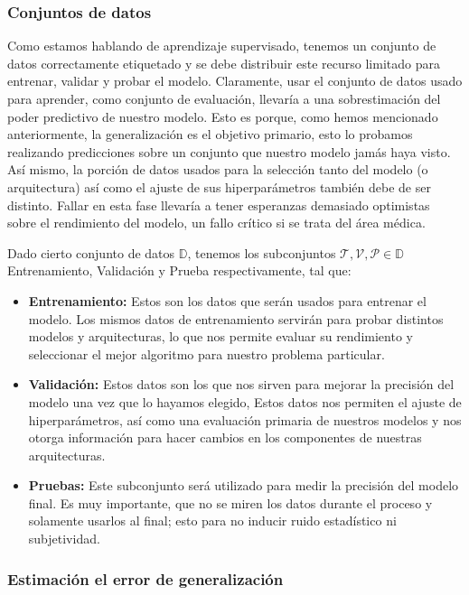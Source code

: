 \subsubsection{Conjuntos de datos}

Como estamos hablando de aprendizaje supervisado, tenemos un conjunto de datos
correctamente etiquetado y se debe distribuir este recurso limitado para
entrenar, validar y probar el modelo. Claramente, usar el conjunto de datos
usado para aprender, como conjunto de evaluación, llevaría a una sobrestimación
del poder predictivo de nuestro modelo. Esto es porque, como hemos mencionado
anteriormente, la generalización es el objetivo primario, esto lo probamos
realizando predicciones sobre un conjunto que nuestro modelo jamás haya visto.
Así mismo, la porción de datos usados para la selección tanto del modelo (o
arquitectura) así como el ajuste de sus hiperparámetros también debe de ser
distinto. Fallar en esta fase llevaría a tener esperanzas demasiado optimistas
sobre el rendimiento del modelo, un fallo crítico si se trata del área
médica.~\cite{Learningb}

Dado cierto conjunto de datos \(\mathbb{D}\), tenemos los subconjuntos
\(\mathcal{T}, \mathcal{V}, \mathcal{P} \in \mathbb{D}\) Entrenamiento,
Validación y Prueba respectivamente, tal que:

\begin{itemize}
    \item{\textbf{Entrenamiento:}} Estos son los datos que serán usados para
    entrenar el modelo. Los mismos datos de entrenamiento servirán para probar
    distintos modelos y arquitecturas, lo que nos permite evaluar su rendimiento
    y seleccionar el mejor algoritmo para nuestro problema particular. 
    \item{\textbf{Validación:}} Estos datos son los que nos sirven para mejorar
    la precisión del modelo una vez que lo hayamos elegido, Estos datos nos
    permiten el ajuste de hiperparámetros, así como una evaluación primaria de
    nuestros modelos y nos otorga información para hacer cambios en los
    componentes de nuestras arquitecturas.
    \item{\textbf{Pruebas:}} Este subconjunto será utilizado para medir la
    precisión del modelo final. Es muy importante, que no se miren los datos
    durante el proceso y solamente usarlos al final; esto para no inducir ruido
    estadístico ni subjetividad. 
\end{itemize}    

\subsubsection{Estimación el error de generalización}

